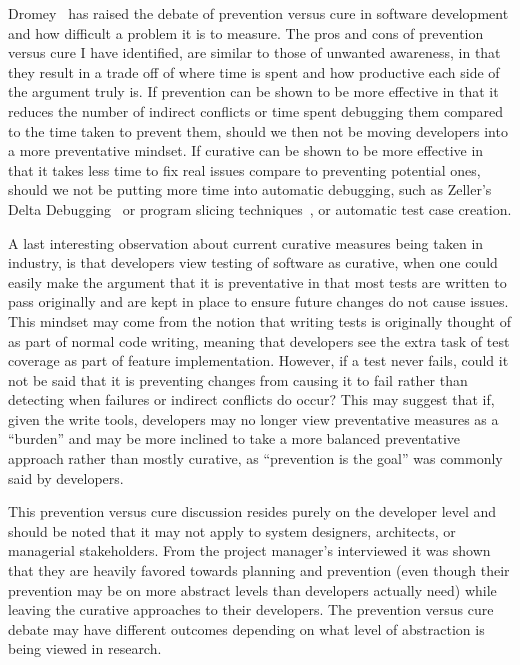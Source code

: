 Dromey~\cite{Dromey:2003} has raised the debate of prevention versus cure in software development and how difficult a problem it is
to measure. The pros and cons of prevention versus cure I have identified, are similar to those of unwanted awareness,
in that they result in a trade off 
of where time is spent and how productive each side of the argument truly is. If prevention can be shown to be more effective in that
it reduces the number of indirect conflicts or time spent debugging them compared to the time taken to prevent them, should we then
not be moving developers into a more preventative mindset. If curative can be shown to be more effective in that it takes less time
to fix real issues compare to preventing potential ones, should we not be putting more time into automatic debugging, such as
Zeller's Delta Debugging~\cite{Zeller:2002:ICC} or program slicing techniques~\cite{Weiser:1982:PUS}, or automatic test case creation.

A last interesting observation about current curative measures being taken in industry, is that developers view testing of software 
as curative, when one could easily make the argument that it is preventative in that most tests are written to pass originally and
are kept in place to ensure future changes do not cause issues. This mindset may come from the notion that writing tests is originally
thought of as part of normal code writing, meaning that developers see the extra task of test coverage as part of feature implementation.
However, if a test never fails, could it not be said that it is preventing changes from causing it to fail rather than detecting
when failures or indirect conflicts do occur? This may suggest that if, given the write tools, developers may no longer view preventative
measures as a ``burden'' and may be more inclined to take a more balanced preventative approach rather than mostly curative, as
``prevention is the goal'' was commonly said by developers.

This prevention versus cure discussion resides purely on the developer level and should be noted that it may not apply to system
designers, architects, or managerial stakeholders. 
From the project manager's interviewed it was shown that they are heavily favored towards planning and 
prevention (even though their prevention may be on more abstract levels than developers actually need) while leaving the curative
approaches to their developers. The prevention versus cure debate may have different outcomes depending on what level of abstraction
is being viewed in research.


